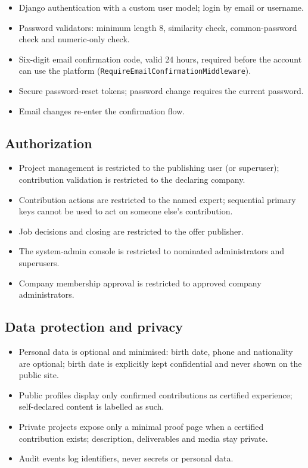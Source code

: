 \documentclass[11pt,a4paper]{article}
\begin{document}
\begin{itemize}[leftmargin=1.4em,itemsep=3pt]
  \item Django authentication with a custom user model; login by email or
        username.
  \item Password validators: minimum length 8, similarity check, common-password
        check and numeric-only check.
  \item Six-digit email confirmation code, valid 24 hours, required before the
        account can use the platform (\texttt{RequireEmailConfirmationMiddleware}).
  \item Secure password-reset tokens; password change requires the current
        password.
  \item Email changes re-enter the confirmation flow.
\end{itemize}

\subsection{Authorization}

\begin{itemize}[leftmargin=1.4em,itemsep=3pt]
  \item Project management is restricted to the publishing user (or
        superuser); contribution validation is restricted to the declaring
        company.
  \item Contribution actions are restricted to the named expert; sequential
        primary keys cannot be used to act on someone else's contribution.
  \item Job decisions and closing are restricted to the offer publisher.
  \item The system-admin console is restricted to nominated administrators and
        superusers.
  \item Company membership approval is restricted to approved company
        administrators.
\end{itemize}

\subsection{Data protection and privacy}

\begin{itemize}[leftmargin=1.4em,itemsep=3pt]
  \item Personal data is optional and minimised: birth date, phone and
        nationality are optional; birth date is explicitly kept confidential
        and never shown on the public site.
  \item Public profiles display only confirmed contributions as certified
        experience; self-declared content is labelled as such.
  \item Private projects expose only a minimal proof page when a certified
        contribution exists; description, deliverables and media stay private.
  \item Audit events log identifiers, never secrets or personal data.
\end{itemize}
\end{document}
